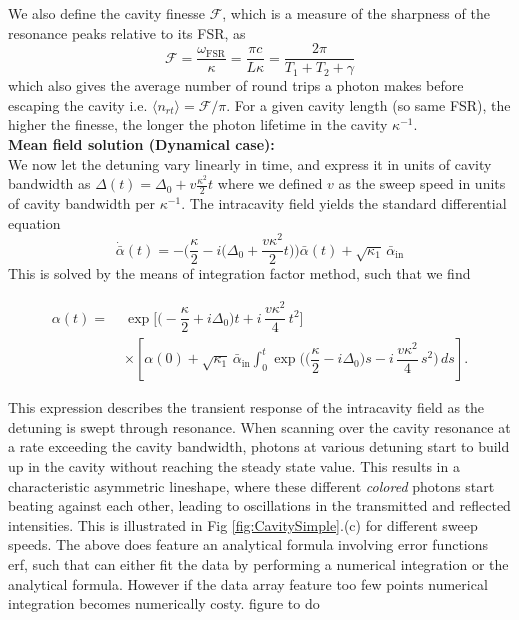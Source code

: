 We also define the cavity finesse $\mathcal{F}$, which is a measure of the sharpness of the resonance peaks relative to its FSR, as
\begin{equation}
  \mathcal{F} = \frac{\omega_{\mathrm{FSR}}}{\kappa} = \frac{\pi c}{L \kappa} = \frac{2\pi}{T_1 + T_2 + \gamma}
\end{equation}
which also gives the average number of round trips a photon makes before escaping the cavity i.e. $\langle n_{rt} \rangle = \mathcal{F}/\pi$. For a given cavity length (so same FSR), the higher the finesse, the longer the photon lifetime in the cavity $\kappa^{-1}$. \\


\noindent \textbf{Mean field solution (Dynamical case): } \\
We now let the detuning vary linearly in time, and express it in units of cavity bandwidth as $\Delta(t)= \Delta_0 + v \frac{\kappa^2}{2}t$ where we defined $v$ as the sweep speed in units of cavity bandwidth per $\kappa^{-1}$. The intracavity field yields the standard differential equation
\begin{equation}
  \dot{\bar{\alpha}}(t) = -\Bigg(\frac{\kappa}{2} - i\Big(\Delta_0 + \frac{v \kappa^2}{2}t\Big)\Bigg) \bar{\alpha}(t) + \sqrt{\kappa_1} \, \bar{\alpha}_{\mathrm{in}}
\end{equation} 
This is solved by the means of integration factor method, such that we find

\begin{equation}
\begin{split}
\alpha(t) =\;
& \exp\!\Bigg[ \Big(-\dfrac{\kappa}{2} + i\Delta_{0}\Big)t
+ i\,\dfrac{v\kappa^{2}}{4}\,t^{2} \Bigg] \\
& \times \left[
\alpha(0) + \sqrt{\kappa_{1}}\,\bar{\alpha}_{\mathrm{in}}
\int_{0}^{t} \exp\!\Bigg( \Big(\dfrac{\kappa}{2}-i\Delta_{0}\Big)s
- i\,\dfrac{v\kappa^{2}}{4}\,s^{2} \Bigg)\,ds
\right].
\end{split}
\end{equation}


This expression describes the transient response of the intracavity field as the detuning is swept through resonance. When scanning over the cavity resonance at a rate exceeding the cavity bandwidth, photons at various detuning start to build up in the cavity without reaching the steady state value. This results in a characteristic asymmetric lineshape, where these different \textit{colored} photons start beating against each other, leading to oscillations in the transmitted and reflected intensities. This is illustrated in Fig \ref{fig:CavitySimple}.(c) for different sweep speeds. The above does feature an analytical formula involving error functions erf, such that can either fit the data by performing a numerical integration or the analytical formula. However if the data array feature too few points numerical integration becomes numerically costy. \color{red} figure to do \color{black} \\


